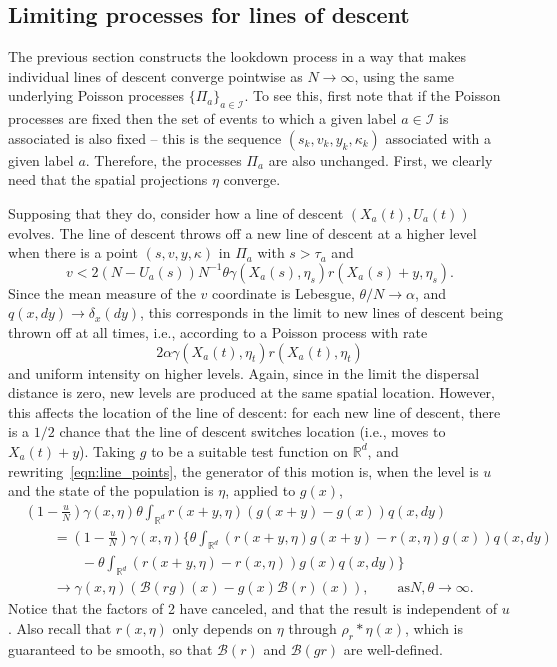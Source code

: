 \documentclass[12pt]{article}
\newcommand{\IR}{\mathbb R}
\newcommand{\DG}{\mathcal{B}}  %
\newcommand{\kernel}{\rho}  %
\newcommand{\smooth}[1]{\kernel_{#1} \! * \!}  %
\newcommand{\labelspace}{\mathcal{I}} %
\begin{document}
\subsection{Limiting processes for lines of descent}
\label{sec:limiting_lines_of_descent}

The previous section constructs the lookdown process
in a way that makes individual lines of descent converge pointwise as $N \to \infty$,
using the same underlying Poisson processes $\{\Pi_a\}_{a \in \labelspace}$.
To see this, first note that if the Poisson processes are fixed
then the set of events to which a given label $a \in \labelspace$ is associated
is also fixed -- this is the sequence $(s_k, v_k, y_k, \kappa_k)$ associated with a given label $a$.
Therefore, the processes $\Pi_a$ are also unchanged.
First, we clearly need that the spatial projections $\eta$ converge.

Supposing that they do,
consider how a line of descent $(X_a(t), U_a(t))$ evolves.
The line of descent throws off a new line of descent at a higher level
when there is a point $(s, v, y, \kappa)$ in $\Pi_a$ with $s > \tau_a$ and
\begin{equation} \label{eqn:line_points}
    v < 2 (N - U_a(s)) N^{-1} \theta \gamma(X_a(s), \eta_s) r(X_a(s) + y, \eta_s) .
\end{equation}
Since the mean measure of the $v$ coordinate is Lebesgue,
$\theta/N \to \alpha$,
and $q(x, dy) \to \delta_x(dy)$,
this corresponds in the limit to new lines of descent being thrown off at all times,
i.e., according to a Poisson process with rate
$$
2 \alpha \gamma(X_a(t), \eta_t) r(X_a(t), \eta_t) 
$$
and uniform intensity on higher levels.
Again, since in the limit the dispersal distance is zero,
new levels are produced at the same spatial location.
However, this affects the location of the line of descent:
for each new line of descent, there is a $1/2$ chance
that the line of descent switches location (i.e., moves to $X_a(t) + y$).
Taking $g$ to be a suitable test function on $\IR^d$, 
and rewriting~\eqref{eqn:line_points},
the generator of this motion is, when the level is $u$
and the state of the population is $\eta$,
applied to $g(x)$,
\begin{align*}
    &
    \left(1 - \frac{u}{N}\right) \gamma(x, \eta)
    \theta \int_{\IR^d} r(x+y, \eta) (g(x+y) - g(x)) q(x, dy) \\
    &\qquad {}
    =
    \left(1 - \frac{u}{N}\right) \gamma(x, \eta)
    \bigg\{
        \theta \int_{\IR^d} (r(x+y, \eta) g(x+y) - r(x, \eta) g(x)) q(x, dy) \\
        &\qquad \qquad {}
        -
        \theta \int_{\IR^d} (r(x+y, \eta) - r(x, \eta) ) g(x) q(x, dy) 
    \bigg\} \\
    &\qquad {}
    \to
    \gamma(x, \eta)
    \left(
        \DG(rg)(x) - g(x) \DG(r)(x)
    \right) ,
    \qquad \text{as} N, \theta \to \infty .
\end{align*}
Notice that the factors of 2 have canceled,
and that the result is independent of $u$.
Also recall that $r(x, \eta)$ only depends on $\eta$ through $\smooth{r}\eta(x)$,
which is guaranteed to be smooth, so that $\DG(r)$ and $\DG(gr)$ are well-defined.
\end{document}
